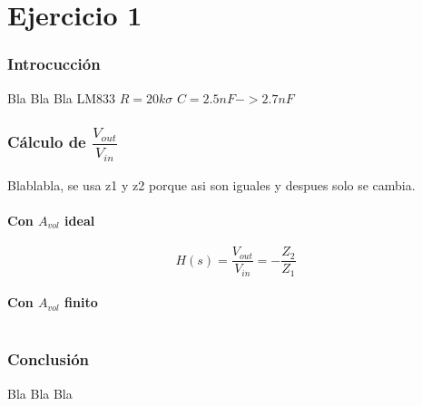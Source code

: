\documentclass[11pt, a4paper]{article}
\begin{document}
\part{Ejercicio 1}
\section{Introcucción}
Bla Bla Bla
LM833
$R=20k\sigma$
$C = 2.5 nF -> 2.7 nF$
\section{Cálculo de $\dfrac{V_{out}}{V_{in}}$}
Blablabla, se usa z1 y z2 porque asi son iguales y despues solo se cambia.
\subsection{Con $A_{vol}$ ideal}
\begin{equation}
	H(s) = \dfrac{V_{out}}{V_{in}} = -\dfrac{Z_2}{Z_1}
\end{equation}

\subsection{Con $A_{vol}$ finito}
\begin{equation}

\end{equation}
\section{Conclusión}
Bla Bla Bla
\end{document}
